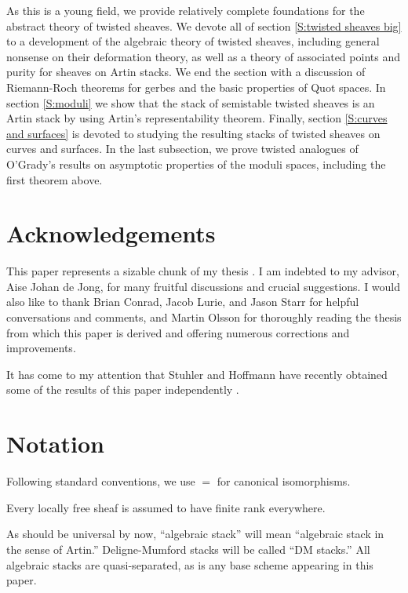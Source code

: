 \documentclass[11pt]{amsart}
\renewcommand{\[}{[\!\hspace{0.03em}[}
\renewcommand{\]}{]\!\hspace{0.03em}]}
\renewcommand{\(}{(\!\hspace{0.03em}(}
\renewcommand{\)}{)\!\hspace{0.03em})}
\theoremstyle{definition}
\theoremstyle{remark}
\begin{document}
As this is a young field, we provide relatively 
complete foundations for the abstract theory of twisted sheaves.  We devote all of section 
\ref{S:twisted sheaves big} to a development of the algebraic theory 
of twisted sheaves, including general nonsense on their deformation 
theory, as well as a theory of associated points and purity for 
sheaves on Artin stacks.  We end the section with a discussion of 
Riemann-Roch theorems for gerbes and the basic properties of Quot 
spaces.  In section \ref{S:moduli} we show that the stack of semistable 
twisted sheaves is an Artin stack by using Artin's representability 
theorem.  Finally, section \ref{S:curves and surfaces} is devoted to studying the 
resulting stacks of twisted sheaves on curves and surfaces.  In the 
last subsection, we prove twisted analogues of O'Grady's results on 
asymptotic properties of the moduli spaces, including the first theorem above.

\section*{Acknowledgements}

This paper represents a sizable chunk of my thesis \cite{mythesis}.  
I am indebted to my advisor, Aise Johan de 
Jong, for many fruitful discussions and crucial suggestions.  I would also like to thank 
Brian Conrad, Jacob Lurie, and Jason Starr for helpful 
conversations and comments, and Martin Olsson for thoroughly reading 
the thesis from which this paper is derived and offering numerous 
corrections and improvements.

It has come to my attention that Stuhler and Hoffmann have 
recently obtained some of the results of this paper independently 
\cite{stuhler-hoffmann}.

\section*{Notation}



Following standard conventions, we use $=$ for canonical 
isomorphisms.  

Every locally free sheaf is assumed to have finite rank 
everywhere.

As should be universal by now, ``algebraic stack'' will mean 
``algebraic stack in the sense of Artin.''  Deligne-Mumford stacks 
will be called ``DM stacks.''  All algebraic stacks are quasi-separated, as is any base scheme 
appearing in this paper.
\end{document}
